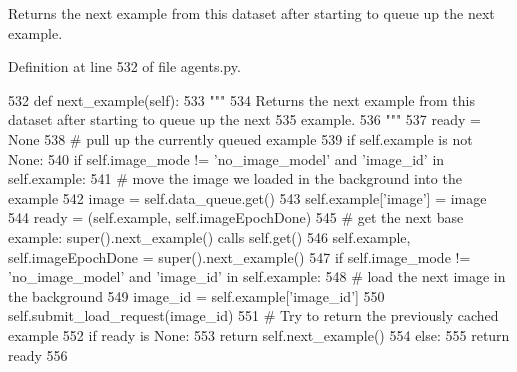 \begin{DoxyVerb}Returns the next example from this dataset after starting to queue up the next
example.
\end{DoxyVerb}
 

Definition at line 532 of file agents.\+py.


\begin{DoxyCode}
532     \textcolor{keyword}{def }next\_example(self):
533         \textcolor{stringliteral}{"""}
534 \textcolor{stringliteral}{        Returns the next example from this dataset after starting to queue up the next}
535 \textcolor{stringliteral}{        example.}
536 \textcolor{stringliteral}{        """}
537         ready = \textcolor{keywordtype}{None}
538         \textcolor{comment}{# pull up the currently queued example}
539         \textcolor{keywordflow}{if} self.example \textcolor{keywordflow}{is} \textcolor{keywordflow}{not} \textcolor{keywordtype}{None}:
540             \textcolor{keywordflow}{if} self.image\_mode != \textcolor{stringliteral}{'no\_image\_model'} \textcolor{keywordflow}{and} \textcolor{stringliteral}{'image\_id'} \textcolor{keywordflow}{in} self.example:
541                 \textcolor{comment}{# move the image we loaded in the background into the example}
542                 image = self.data\_queue.get()
543                 self.example[\textcolor{stringliteral}{'image'}] = image
544             ready = (self.example, self.imageEpochDone)
545         \textcolor{comment}{# get the next base example: super().next\_example() calls self.get()}
546         self.example, self.imageEpochDone = super().next\_example()
547         \textcolor{keywordflow}{if} self.image\_mode != \textcolor{stringliteral}{'no\_image\_model'} \textcolor{keywordflow}{and} \textcolor{stringliteral}{'image\_id'} \textcolor{keywordflow}{in} self.example:
548             \textcolor{comment}{# load the next image in the background}
549             image\_id = self.example[\textcolor{stringliteral}{'image\_id'}]
550             self.submit\_load\_request(image\_id)
551         \textcolor{comment}{# Try to return the previously cached example}
552         \textcolor{keywordflow}{if} ready \textcolor{keywordflow}{is} \textcolor{keywordtype}{None}:
553             \textcolor{keywordflow}{return} self.next\_example()
554         \textcolor{keywordflow}{else}:
555             \textcolor{keywordflow}{return} ready
556 
\end{DoxyCode}
\mbox{\label{classparlai_1_1tasks_1_1vqa__v1_1_1agents_1_1OeTeacher_aa932b35d88d65d7f5d61b271bbee71ac}} 
